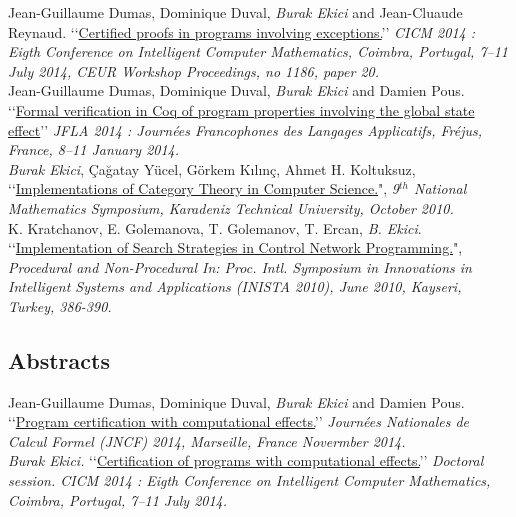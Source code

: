 \documentclass[12pt, a4paper]{article}
\newcommand{\years}[1]{\marginnote{\scriptsize #1}}
\begin{document}
\years{\normalsize2014}Jean-Guillaume Dumas, Dominique Duval, \emph{Burak Ekici} and Jean-Cluaude Reynaud. \lq\lq{}\href{https://hal.archives-ouvertes.fr/hal-00867237}{Certified proofs in programs involving exceptions.}\rq\rq{} \textit{
CICM 2014 : Eigth Conference on Intelligent Computer Mathematics, Coimbra, Portugal, 7--11 July 2014,
CEUR Workshop Proceedings, no 1186, paper 20. }\\[0.25cm]
\years{\normalsize2014}Jean-Guillaume Dumas, Dominique Duval, \emph{Burak Ekici} and Damien Pous. \lq\lq{\href{https://hal.archives-ouvertes.fr/hal-00869230}{Formal verification in Coq of program properties involving the global state effect}}\rq\rq{} \textit{JFLA 2014 : Journées Francophones des Langages Applicatifs, Fréjus, France, 8--11 January 2014. }\\[0.25cm]
\years{\normalsize2010} \emph{Burak Ekici}, Çağatay Yücel, Görkem Kılınç, Ahmet H. Koltuksuz, \lq\lq{}\href{http://ekiciburak.github.io/}{Implementations of Category Theory in Computer Science.}", \emph{9$^{th}$ National Mathematics Symposium, Karadeniz Technical University, October 2010.}\\[0.25cm]
\years{\normalsize2010} K. Kratchanov, E. Golemanova, T. Golemanov, T. Ercan, \emph{B. Ekici}. \lq\lq{}\href{http://arxiv.org/abs/1412.4184}{Implementation of Search Strategies in Control Network Programming.}", \emph{Procedural and Non-Procedural In: Proc. Intl. Symposium in Innovations in Intelligent Systems
and Applications (INISTA 2010), June 2010, Kayseri, Turkey, 386-390.}
\subsection*{Abstracts}
\years{\normalsize2014}Jean-Guillaume Dumas, Dominique Duval, \emph{Burak Ekici} and Damien Pous. \lq\lq{}\href{http://arxiv.org/abs/1411.7140}{Program certification with computational effects.}\rq\rq{} \textit{Journées Nationales de Calcul Formel (JNCF) 2014, Marseille, France Novermber 2014.}\\[0.25cm]
\years{\normalsize2014} \emph{Burak Ekici.} \lq\lq{}\href{http://arxiv.org/abs/1411.7139}{Certification of programs with computational effects.}\rq\rq{} \textit{Doctoral session. CICM 2014 : Eigth Conference on Intelligent Computer Mathematics, Coimbra, Portugal, 7--11 July 2014.}
\end{document}
